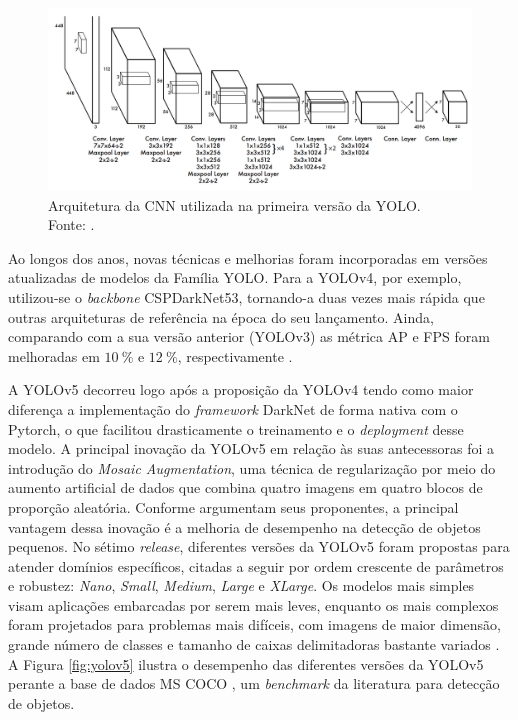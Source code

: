 \begin{figure}[H]
    \centering
    \includegraphics[width=\textwidth]{img/yolo-arquitetura}
    \caption{Arquitetura da CNN utilizada na primeira versão da YOLO.\\ Fonte: \cite{Redmon:YOLOoriginal}.}
    \label{fig:yolo_arch}
\end{figure}


Ao longos dos anos, novas técnicas e melhorias foram incorporadas em versões atualizadas de modelos da Família YOLO. Para a YOLOv4, por exemplo, utilizou-se o \emph{backbone} CSPDarkNet53, tornando-a duas vezes mais rápida que outras arquiteturas de referência na época do seu lançamento. Ainda, comparando com a sua versão anterior (YOLOv3) as métrica AP e FPS foram melhoradas em $\SI{10}{\percent}$ e $\SI{12}{\percent}$, respectivamente \cite{Bochkovski:YOLOv4}.

A YOLOv5 decorreu logo após a proposição da YOLOv4 tendo como maior diferença a implementação do \emph{framework} DarkNet de forma nativa com o Pytorch, o que facilitou drasticamente o treinamento e o \emph{deployment} desse modelo. A principal inovação da YOLOv5 em relação às suas antecessoras foi a introdução do \emph{Mosaic Augmentation}, uma técnica de regularização por meio do aumento artificial de dados que combina quatro imagens em quatro blocos de proporção aleatória. Conforme argumentam seus proponentes, a principal vantagem dessa inovação é a melhoria de desempenho na detecção de objetos pequenos. No sétimo \emph{release}, diferentes versões da YOLOv5 foram propostas para atender domínios específicos, citadas a seguir por ordem crescente de parâmetros e robustez: \emph{Nano}, \emph{Small}, \emph{Medium}, \emph{Large} e \emph{XLarge}. Os modelos mais simples visam aplicações embarcadas por serem mais leves, enquanto os mais complexos foram projetados para problemas mais difíceis, com imagens de maior dimensão, grande número de classes e tamanho de caixas delimitadoras bastante variados \cite{Jocher:YOLOv5}. A Figura \ref{fig:yolov5} ilustra o desempenho das diferentes versões da YOLOv5 perante a base de dados MS COCO \cite{Microsoft:COCO}, um \emph{benchmark} da literatura para detecção de objetos.

